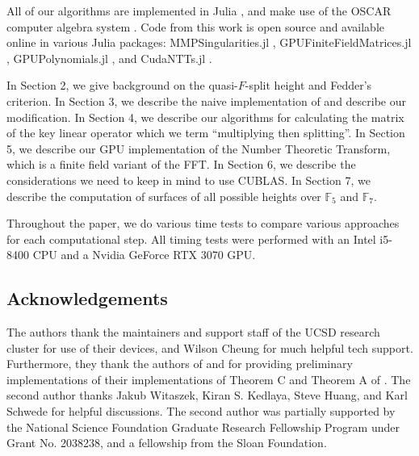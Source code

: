 All of our algorithms are implemented in Julia 
\cite{julia-2017}, and
make use of the OSCAR computer algebra system 
\cite{OSCAR-book}.
Code from this work is open source and available online 
in various
Julia packages: 
MMPSingularities.jl \cite{mmpsingularities-jl},
GPUFiniteFieldMatrices.jl \cite{gpuffmatrices-jl}, 
GPUPolynomials.jl \cite{gpupolynomials-jl},
and CudaNTTs.jl \cite{cudantts-jl}.

In Section 2, we give background on the quasi-\(F\)-split height
and Fedder's criterion.
In Section 3, we describe the naive implementation of
\cite[Theorem~C]{kty-2022-fedder} and describe
our modification.
In Section 4, we describe our algorithms for calculating the matrix
of the key linear operator which we term ``multiplying then splitting''.
In Section 5, we describe our GPU implementation of the Number Theoretic
Transform, which is a finite field variant of the FFT.
In Section 6, we describe the considerations we need to keep in mind
to use CUBLAS.
In Section 7, we describe the computation of surfaces of all possible
heights over \(\mathbb{F}_{5}\) and \(\mathbb{F}_{7}\).

Throughout the paper, we do various time tests to compare various
approaches for each computational step.
All timing tests were performed with 
an Intel i5-8400 CPU and a Nvidia GeForce RTX 3070 GPU.

\subsection{Acknowledgements}

The authors thank the maintainers and support staff 
of the UCSD research cluster for use of their devices,
and Wilson Cheung for much helpful tech support.
Furthermore, they thank the authors of 
\cite{kty-2022-fedder} and \cite{fgmq-2025-witt-vectors-macaulay2}
for providing preliminary implementations of their
implementations of Theorem C and Theorem A of 
\cite{kty-2022-fedder}.
The second author thanks Jakub Witaszek, Kiran S. Kedlaya,
Steve Huang, and Karl Schwede for helpful discussions.
The second author was partially supported by the 
National Science Foundation Graduate Research
Fellowship Program under Grant No. 2038238, and a fellowship
from the Sloan Foundation.

